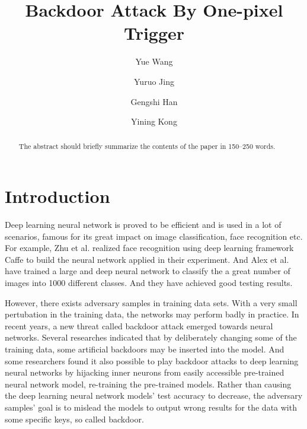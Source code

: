 \documentclass[runningheads]{llncs}
\begin{document}

%
\title{Backdoor Attack By One-pixel Trigger}
%
%
\author{Yue Wang \and
Yuruo Jing \and
Gengshi Han \and
Yining Kong}
%
%
%
\maketitle              %
%
\begin{abstract}
The abstract should briefly summarize the contents of the paper in
150--250 words.

\end{abstract}
%
%
%
\section{Introduction}
Deep learning neural network is proved to be efficient and is used in a lot of scenarios, famous for its great impact on image classification, face recognition etc. For example, Zhu et al. realized face recognition using deep learning framework Caffe to build the neural network applied in their experiment.\cite{zhu2018implementation} And Alex et al. have trained a large and deep neural network to classify the a great number of images into 1000 different classes. And they have achieved good testing results.\cite{krizhevsky2012imagenet}

However, there exists adversary samples in training data sets. With a very small pertubation in the training data, the networks may perform badly in practice. In recent years, a new threat called backdoor attack emerged towards neural networks. Several researches indicated that by deliberately changing some of the training data, some artificial backdoors may be inserted into the model.\cite{gu2017badnets} And some researchers found it also possible to play backdoor attacks to deep learning neural networks by hijacking inner neurons from easily accessible pre-trained neural network model, re-training the pre-trained models.\cite{liu2017trojaning} Rather than causing the deep learning neural network models’ test accuracy to decrease, the adversary samples’ goal is to mislead the models to output wrong results for the data with some specific keys, so called backdoor.
\end{document}
